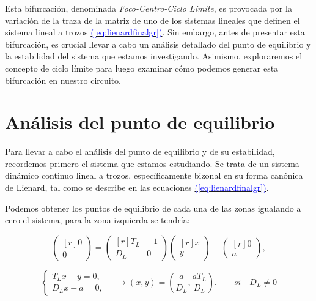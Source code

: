 \documentclass[12pt,a4paper]{report} %
\newcommand{\eref}[1]{\hyperref[#1]{\textcolor{blue}{(\ref*{#1})}}}
\begin{document}
	\vspace{0.5cm}\noindent Esta bifurcación, denominada \textit{Foco-Centro-Ciclo Límite}, es provocada por la variación de la traza de la matriz de uno de los sistemas lineales que definen el sistema lineal a trozos \eref{eq:lienardfinalgr}. Sin embargo, antes de presentar esta bifurcación, es crucial llevar a cabo un análisis detallado del punto de equilibrio y la estabilidad del sistema que estamos investigando. Asimismo, exploraremos el concepto de ciclo límite para luego examinar cómo podemos generar esta bifurcación en nuestro circuito.
	
	\section{Análisis del punto de equilibrio}
	\label{sec:41}
	
		Para llevar a cabo el análisis del punto de equilibrio y de su estabilidad, recordemos primero el sistema que estamos estudiando. Se trata de un sistema dinámico continuo lineal a trozos, específicamente bizonal en su forma canónica de Lienard, tal como se describe en las ecuaciones \eref{eq:lienardfinalgr}.
		
		\vspace{0.5cm}Podemos obtener los puntos de equilibrio de cada una de las zonas igualando a cero el sistema, para la zona izquierda se tendría:

		
		\begin{equation*}
			\begin{pmatrix*}[r]
				0\\ 0
			\end{pmatrix*}= \begin{pmatrix*}[r]
				T_L & -1 \\ D_L & 0
			\end{pmatrix*} \begin{pmatrix*}[r]
				x \\ y
			\end{pmatrix*}-\begin{pmatrix*}[r]
				0 \\ a
			\end{pmatrix*},
		\end{equation*}\smallskip
		
		\begin{equation}
			\label{eq:eqpointL}
			\left\{
			\begin{aligned}
				T_Lx-y=0,\\
				D_Lx-a=0,
			\end{aligned}
			\right. \quad \longrightarrow \left( \overline{x},\overline{y} \right)=\left( \frac{a}{D_L},\frac{aT_L}{D_L} \right). \qquad si \quad D_L\neq0
		\end{equation}\smallskip
		
\end{document}

